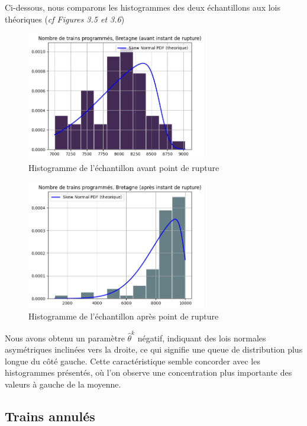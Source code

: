 {Ci-dessous, nous comparons les histogrammes des deux échantillons aux lois théoriques (\textit{cf Figures 3.5 et 3.6})

\begin{figure}[H]
  \centering
  \includegraphics[width=0.7\textwidth]{image/BR-FIG5.png}
  \caption{Histogramme de l'échantillon avant point de rupture}
\end{figure}

\begin{figure}[H]
  \centering
  \includegraphics[width=0.7\textwidth]{image/BR-FIG6.png}
  \caption{Histogramme de l'échantillon après point de rupture}
\end{figure}

Nous avons obtenu un paramètre $\hat{\theta}^k$ négatif, indiquant des lois normales asymétriques inclinées vers la droite, ce qui signifie une queue de distribution plus longue du côté gauche. Cette caractéristique semble concorder avec les histogrammes présentés, où l'on observe une concentration plus importante des valeurs à gauche de la moyenne.

\subsection{Trains annulés}

}
